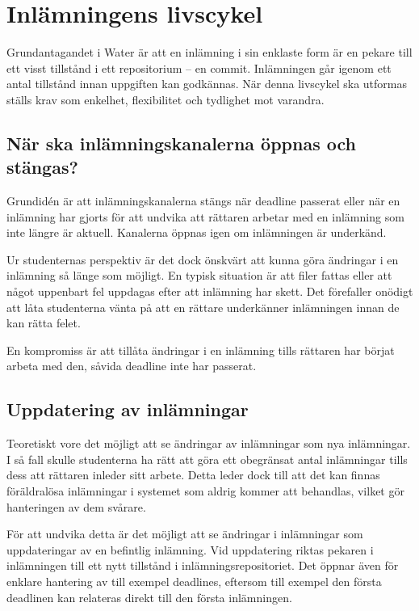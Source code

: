 \section{Inlämningens livscykel}

Grundantagandet i Water är att en inlämning i sin enklaste form är en pekare till ett visst tillstånd i ett repositorium – en commit. Inlämningen går igenom ett antal tillstånd innan uppgiften kan godkännas. När denna livscykel ska utformas ställs krav som enkelhet, flexibilitet och tydlighet mot varandra.

\subsection{När ska inlämningskanalerna öppnas och stängas?}
Grundidén är att inlämningskanalerna stängs när deadline passerat eller när en inlämning har gjorts för att undvika att rättaren arbetar med en inlämning som inte längre är aktuell. Kanalerna öppnas igen om inlämningen är underkänd.

Ur studenternas perspektiv är det dock önskvärt att kunna göra ändringar i en inlämning så länge som möjligt. En typisk situation är att filer fattas eller att något uppenbart fel uppdagas efter att inlämning har skett. Det förefaller onödigt att låta studenterna vänta på att en rättare underkänner inlämningen innan de kan rätta felet.

En kompromiss är att tillåta ändringar i en inlämning tills rättaren har börjat arbeta med den, såvida deadline inte har passerat.

\subsection{Uppdatering av inlämningar}\label{sec:uppdatering-inlamningar}
Teoretiskt vore det möjligt att se ändringar av inlämningar som nya inlämningar. I så fall skulle studenterna ha rätt att göra ett obegränsat antal inlämningar tills dess att rättaren inleder sitt arbete. Detta leder dock till att det kan finnas föräldralösa inlämningar i systemet som aldrig kommer att behandlas, vilket gör hanteringen av dem svårare.

För att undvika detta är det möjligt att se ändringar i inlämningar som uppdateringar av en befintlig inlämning. Vid uppdatering riktas pekaren i inlämningen till ett nytt tillstånd i inlämningsrepositoriet. Det öppnar även för enklare hantering av till exempel deadlines, eftersom till exempel den första deadlinen kan relateras direkt till den första inlämningen.

